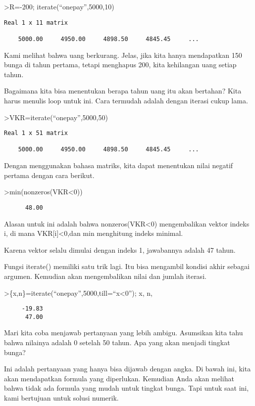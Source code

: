 \documentclass[
]{book}
\begin{document}
\textgreater R=-200; iterate(``onepay'',5000,10)

\begin{verbatim}
Real 1 x 11 matrix

    5000.00     4950.00     4898.50     4845.45     ...
\end{verbatim}

Kami melihat bahwa uang berkurang. Jelas, jika kita hanya mendapatkan 150 bunga di tahun pertama, tetapi menghapus 200, kita kehilangan uang setiap tahun.

Bagaimana kita bisa menentukan berapa tahun uang itu akan bertahan? Kita harus menulis loop untuk ini. Cara termudah adalah dengan iterasi cukup lama.

\textgreater VKR=iterate(``onepay'',5000,50)

\begin{verbatim}
Real 1 x 51 matrix

    5000.00     4950.00     4898.50     4845.45     ...
\end{verbatim}

Dengan menggunakan bahasa matriks, kita dapat menentukan nilai negatif pertama dengan cara berikut.

\textgreater min(nonzeros(VKR\textless0))

\begin{verbatim}
      48.00 
\end{verbatim}

Alasan untuk ini adalah bahwa nonzeros(VKR\textless0) mengembalikan vektor indeks i, di mana VKR{[}i{]}\textless0,dan min menghitung indeks minimal.

Karena vektor selalu dimulai dengan indeks 1, jawabannya adalah 47 tahun.

Fungsi iterate() memiliki satu trik lagi. Itu bisa mengambil kondisi akhir sebagai argumen. Kemudian akan mengembalikan nilai dan jumlah iterasi.

\textgreater\{x,n\}=iterate(``onepay'',5000,till=``x\textless0''); x, n,

\begin{verbatim}
     -19.83 
      47.00 
\end{verbatim}

Mari kita coba menjawab pertanyaan yang lebih ambigu. Asumsikan kita tahu bahwa nilainya adalah 0 setelah 50 tahun. Apa yang akan menjadi tingkat bunga?

Ini adalah pertanyaan yang hanya bisa dijawab dengan angka. Di bawah ini, kita akan mendapatkan formula yang diperlukan. Kemudian Anda akan melihat bahwa tidak ada formula yang mudah untuk tingkat bunga. Tapi untuk saat ini, kami bertujuan untuk solusi numerik.
\end{document}
